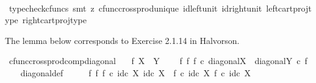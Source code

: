 \begin{isabellebody}
%
\isadelimproof
\ \ %
\endisadelimproof
%
\isatagproof
{}\isamarkupfalse%
\ {\isacharparenleft}{\kern0pt}typecheck{\isacharunderscore}{\kern0pt}cfuncs{\isacharcomma}{\kern0pt}\ smt\ {\isacharparenleft}{\kern0pt}z{}{\isacharparenright}{\kern0pt}\ cfunc{\isacharunderscore}{\kern0pt}cross{\isacharunderscore}{\kern0pt}prod{\isacharunderscore}{\kern0pt}unique\ id{\isacharunderscore}{\kern0pt}left{\isacharunderscore}{\kern0pt}unit{}\ id{\isacharunderscore}{\kern0pt}right{\isacharunderscore}{\kern0pt}unit{}\ left{\isacharunderscore}{\kern0pt}cart{\isacharunderscore}{\kern0pt}proj{\isacharunderscore}{\kern0pt}type\ right{\isacharunderscore}{\kern0pt}cart{\isacharunderscore}{\kern0pt}proj{\isacharunderscore}{\kern0pt}type{\isacharparenright}{\kern0pt}%
\endisatagproof
{\isafoldproof}%
%
\isadelimproof
%
\endisadelimproof
%
\begin{isamarkuptext}%
The lemma below corresponds to Exercise 2.1.14 in Halvorson.%
\end{isamarkuptext}\isamarkuptrue%
\isamarkupfalse%
\ cfunc{\isacharunderscore}{\kern0pt}cross{\isacharunderscore}{\kern0pt}prod{\isacharunderscore}{\kern0pt}comp{\isacharunderscore}{\kern0pt}diagonal{\isacharcolon}{\kern0pt}\isanewline
\ \ \ {\isachardoublequoteopen}f{\isacharcolon}{\kern0pt}\ X\ {\isasymrightarrow}\ Y{\isachardoublequoteclose}\ \isanewline
\ \ \ {\isachardoublequoteopen}{\isacharparenleft}{\kern0pt}f\ {\isasymtimes}\isactrlsub f\ f{\isacharparenright}{\kern0pt}\ {\isasymcirc}\isactrlsub c\ diagonal{\isacharparenleft}{\kern0pt}X{\isacharparenright}{\kern0pt}\ {\isacharequal}{\kern0pt}\ diagonal{\isacharparenleft}{\kern0pt}Y{\isacharparenright}{\kern0pt}\ {\isasymcirc}\isactrlsub c\ f{\isachardoublequoteclose}\isanewline
%
\isadelimproof
\ \ %
\endisadelimproof
%
\isatagproof
{}\isamarkupfalse%
\ diagonal{\isacharunderscore}{\kern0pt}def\isanewline
{}\isamarkupfalse%
\ {\isacharminus}{\kern0pt}\isanewline
\ \ \isamarkupfalse%
\ {\isachardoublequoteopen}{\isacharparenleft}{\kern0pt}f\ {\isasymtimes}\isactrlsub f\ f{\isacharparenright}{\kern0pt}\ {\isasymcirc}\isactrlsub c\ {\isasymlangle}id\isactrlsub c\ X{\isacharcomma}{\kern0pt}\ id\isactrlsub c\ X{\isasymrangle}\ {\isacharequal}{\kern0pt}\ {\isasymlangle}f\ {\isasymcirc}\isactrlsub c\ id\isactrlsub c\ X{\isacharcomma}{\kern0pt}\ f\ {\isasymcirc}\isactrlsub c\ id\isactrlsub c\ X{\isasymrangle}{\isachardoublequoteclose}\isanewline
\ \ \ \ \isamarkupfalse%

\end{isabellebody}
